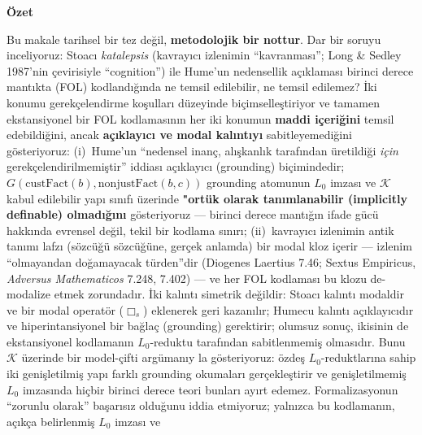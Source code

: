 \documentclass[11pt]{article}
\theoremstyle{plain}
\theoremstyle{definition}
\theoremstyle{remark}
\begin{document}
\begin{center}\textbf{\"{O}zet}\end{center}
Bu makale tarihsel bir tez de\u{g}il, \textbf{metodolojik bir nottur}.
Dar bir soruyu inceliyoruz: Stoac{\i} \emph{katalepsis} (kavray{\i}c{\i}
izlenimin ``kavranmas{\i}''; Long \& Sedley 1987'nin \c{c}evirisiyle
``cognition'') ile Hume'un nedensellik a\c{c}{\i}klamas{\i} birinci
derece mant{\i}kta (FOL) kodland{\i}\u{g}{\i}nda ne temsil edilebilir,
ne temsil edilemez? \.{I}ki konumu gerek\c{c}elendirme ko\c{s}ullar{\i}
d\"uzeyinde bi\c{c}imselle\c{s}tiriyor ve tamamen ekstansiyonel bir FOL
kodlamas{\i}n{\i}n her iki konumun \textbf{maddi i\c{c}eri\u{g}ini}
temsil edebildi\u{g}ini, ancak \textbf{a\c{c}{\i}klay{\i}c{\i} ve modal
kal{\i}nt{\i}y{\i}} sabitleyemedi\u{g}ini g\"osteriyoruz:
(i)~Hume'un ``nedensel inan\c{c}, al{\i}\c{s}kanl{\i}k taraf{\i}ndan
\"uretildi\u{g}i \emph{i\c{c}in} gerek\c{c}elendirilmemi\c{s}tir''
iddias{\i} a\c{c}{\i}klay{\i}c{\i} (grounding) bi\c{c}imindedir;
$G(\mathrm{custFact}(b),\mathrm{nonjustFact}(b,c))$ grounding atomunun
$L_0$ imzas{\i} ve $\mathcal K$ kabul edilebilir yap{\i} s{\i}n{\i}f{\i}
\"uzerinde \textbf{"ort\"uk olarak tan{\i}mlanabilir (implicitly
definable) olmad{\i}\u{g}{\i}n{\i}} g\"osteriyoruz --- birinci derece
mant{\i}\u{g}{\i}n ifade g\"uc\"u hakk{\i}nda evrensel de\u{g}il, tekil
bir kodlama s{\i}n{\i}r{\i};
(ii)~kavray{\i}c{\i} izlenimin antik tan{\i}m{\i} lafz{\i}
(s\"ozc\"u\u{g}\"u s\"ozc\"u\u{g}\"une, ger\c{c}ek anlamda) bir modal
kloz i\c{c}erir --- izlenim ``olmayandan do\u{g}amayacak
t\"urden''dir (Diogenes Laertius 7.46; Sextus Empiricus,
\emph{Adversus Mathematicos} 7.248, 7.402) --- ve her FOL kodlamas{\i}
bu klozu de-modalize etmek zorundad{\i}r. \.{I}ki kal{\i}nt{\i}
simetrik de\u{g}ildir: Stoac{\i} kal{\i}nt{\i} modaldir ve bir modal
operat\"or ($\Box_s$) eklenerek geri kazan{\i}l{\i}r; Humecu kal{\i}nt{\i}
a\c{c}{\i}klay{\i}c{\i}d{\i}r ve hiperintansiyonel bir ba\u{g}la\c{c}
(grounding) gerektirir; olumsuz sonu\c{c}, ikisinin de ekstansiyonel
kodlaman{\i}n $L_0$-reduktu taraf{\i}ndan sabitlenmemi\c{s} olmas{\i}d{\i}r.
Bunu $\mathcal K$ \"uzerinde bir model-\c{c}ifti arg\"uman{\i}y la
g\"osteriyoruz: \"ozde\c{s} $L_0$-reduktlar{\i}na sahip iki geni\c{s}letilmi\c{s}
yap{\i} farkl{\i} grounding okumalar{\i} ger\c{c}ekle\c{s}tirir ve
geni\c{s}letilmemi\c{s} $L_0$ imzas{\i}nda hi\c{c}bir birinci derece
teori bunlar{\i} ay{\i}rt edemez. Formalizasyonun ``zorunlu olarak''
ba\c{s}ar{\i}s{\i}z oldu\u{g}unu iddia etmiyoruz; yaln{\i}zca bu
kodlaman{\i}n, a\c{c}{\i}k\c{c}a belirlenmi\c{s} $L_0$ imzas{\i} ve
\end{document}
